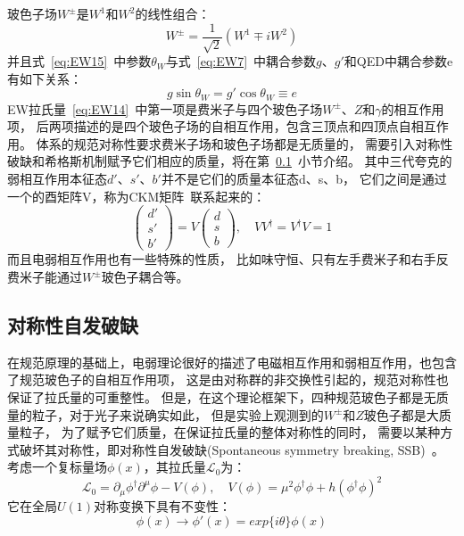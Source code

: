 玻色子场$W^{\pm}$是$W^1$和$W^2$的线性组合：
\begin{equation} 
\label{eq:EW16}
W^{\pm}=\frac{1}{\sqrt{2}}\left(   W^1 \mp iW^2  \right)
\end{equation}
并且式~\ref{eq:EW15}~中参数$\theta_W$与式~\ref{eq:EW7}~中耦合参数$g$、$g'$和QED中耦合参数e有如下关系：
\begin{equation} 
\label{eq:EW17}
g \sin \theta_W = g' \cos \theta_W \equiv e
\end{equation}
EW拉氏量~\ref{eq:EW14}~中第一项是费米子与四个玻色子场$W^{\pm}$、$Z$和$\gamma$的相互作用项，
后两项描述的是四个玻色子场的自相互作用，包含三顶点和四顶点自相互作用。
体系的规范对称性要求费米子场和玻色子场都是无质量的，
需要引入对称性破缺和希格斯机制赋予它们相应的质量，将在第~\ref{sec:SSB}~小节介绍。
其中三代夸克的弱相互作用本征态$d'$、$s'$、$b'$并不是它们的质量本征态d、s、b，
它们之间是通过一个的酉矩阵V，称为CKM矩阵~\cite{CKM}联系起来的：
\begin{equation} 
\label{eq:EW18}
 \left( \begin{array}{l} d' \\  s' \\ b' \end{array} \right) = V
 \left( \begin{array}{l} d \\  s \\ b \end{array} \right), \quad VV^{\dagger}=V^{\dagger}V=1
\end{equation}
而且电弱相互作用也有一些特殊的性质，
比如味守恒、只有左手费米子和右手反费米子能通过$W^{\pm}$玻色子耦合等。

\subsection{对称性自发破缺}
\label{sec:SSB}

在规范原理的基础上，电弱理论很好的描述了电磁相互作用和弱相互作用，也包含了规范玻色子的自相互作用项，
这是由对称群的非交换性引起的，规范对称性也保证了拉氏量的可重整性。
但是，在这个理论框架下，四种规范玻色子都是无质量的粒子，对于光子来说确实如此，
但是实验上观测到的$W^{\pm}$和$Z$玻色子都是大质量粒子，
为了赋予它们质量，在保证拉氏量的整体对称性的同时，
需要以某种方式破坏其对称性，即对称性自发破缺(Spontaneous symmetry breaking, SSB)~\cite{SM4,SM5,SM6}。
考虑一个复标量场$\phi(x)$，其拉氏量$\mathcal{L}_0$为：
\begin{equation} 
\label{eq:SSB1}
\mathcal{L}_0= \partial_{\mu} \phi^{\dagger} \partial^{\mu} \phi - V(\phi), \quad
V(\phi)=\mu^2 \phi^{\dagger} \phi + h \left(  \phi^{\dagger} \phi   \right)^2
\end{equation}
它在全局$U(1)$对称变换下具有不变性：
\begin{equation} 
\label{eq:SSB2}
\phi(x)  \rightarrow \phi'(x)= exp\{ i\theta \}\phi(x)
\end{equation}

